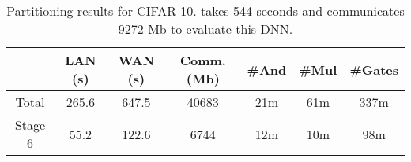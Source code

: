 \begin{table}
\begin{tabular}{c|c|c|c |c|c|c}
           &  LAN (s) & WAN (s) & Comm. (Mb)  & \#And & \#Mul & \#Gates \\
\hline
Total      &  265.6       & 647.5        & 40683       & 21m    & 61m    &  337m  \\
\hline
Stage 6    &  55.2        & 122.6        & 6744        & 12m    & 10m   &  98m  \\
\hline
\end{tabular}

 \caption{Partitioning results for CIFAR-10. \minion takes 544 seconds and communicates 9272 Mb to evaluate this DNN.}
 \label{tab:cifar} 
\end{table}

